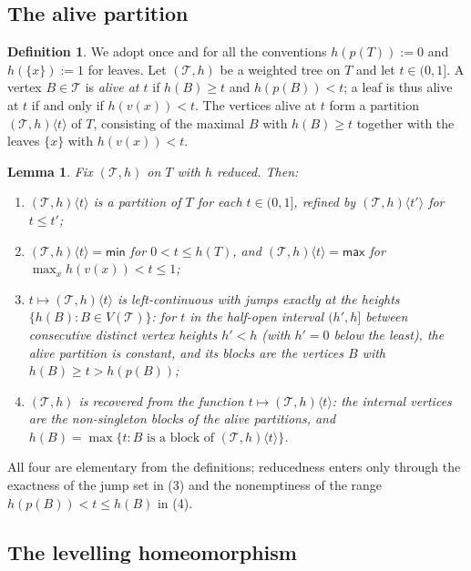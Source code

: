 \documentclass[12pt]{amsart}
\newtheorem{lemma}[subsection]{Lemma}
\theoremstyle{definition}
\newtheorem{definition}[subsection]{Definition}
\theoremstyle{remark}
\newcommand{\TreeF}{\mathcal{T}}                 %
\newcommand{\alive}[2]{#1\langle #2\rangle}      %
\begin{document}
\subsection{The alive partition}\label{sec:alive}

\begin{definition}\label{def:alive}
We adopt once and for all the conventions $h(p(T)) := 0$ and $h(\{x\}) := 1$ for leaves. Let $(\TreeF, h)$ be a weighted tree on $T$ and let $t\in (0,1]$. A vertex $B\in \TreeF$ is \emph{alive at $t$} if $h(B)\geq t$ and $h(p(B)) < t$; a leaf is thus alive at $t$ if and only if $h(v(x))<t$. The vertices alive at $t$ form a partition $\alive{(\TreeF,h)}{t}$ of $T$, consisting of the maximal $B$ with $h(B)\geq t$ together with the leaves $\{x\}$ with $h(v(x)) < t$.
\end{definition}

\begin{lemma}\label{lem:alive-facts}
Fix $(\TreeF, h)$ on $T$ with $h$ reduced. Then:
\begin{enumerate}[label=(\arabic*)]
\item $\alive{(\TreeF,h)}{t}$ is a partition of $T$ for each $t\in(0,1]$, refined by $\alive{(\TreeF,h)}{t'}$ for $t\leq t'$;
\item $\alive{(\TreeF,h)}{t} = \mathsf{min}$ for $0 < t\leq h(T)$, and $\alive{(\TreeF,h)}{t} = \mathsf{max}$ for $\max_x h(v(x)) < t \leq 1$;
\item $t\mapsto \alive{(\TreeF,h)}{t}$ is left-continuous with jumps exactly at the heights $\{h(B) : B\in V(\TreeF)\}$: for $t$ in the half-open interval $(h', h]$ between consecutive distinct vertex heights $h' < h$ (with $h'=0$ below the least), the alive partition is constant, and its blocks are the vertices $B$ with $h(B)\geq t > h(p(B))$;
\item $(\TreeF, h)$ is recovered from the function $t\mapsto \alive{(\TreeF,h)}{t}$: the internal vertices are the non-singleton blocks of the alive partitions, and $h(B) = \max\{t : B \text{ is a block of } \alive{(\TreeF,h)}{t}\}$.
\end{enumerate}
\end{lemma}

All four are elementary from the definitions; reducedness enters only through the exactness of the jump set in (3) and the nonemptiness of the range $h(p(B))<t\leq h(B)$ in (4).

\subsection{The levelling homeomorphism}\label{sec:theta}
\end{document}
